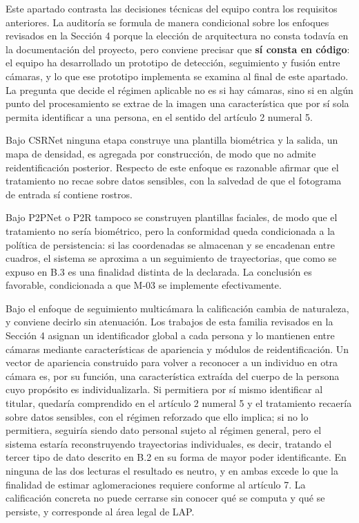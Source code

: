 Este apartado contrasta las decisiones técnicas del equipo contra los
requisitos anteriores. La auditoría se formula de manera condicional
sobre los enfoques revisados en la Sección 4 porque la elección de
arquitectura no consta todavía en la documentación del proyecto, pero
conviene precisar que \textbf{sí consta en código}: el equipo ha
desarrollado un prototipo de detección, seguimiento y fusión entre
cámaras, y lo que ese prototipo implementa se examina al final de este
apartado. La pregunta que decide el régimen aplicable no es si hay
cámaras, sino si en algún punto del procesamiento se extrae de la imagen
una característica que por sí sola permita identificar a una persona, en
el sentido del artículo 2 numeral 5.

Bajo CSRNet \cite{Li_2018_CVPR} ninguna etapa construye una plantilla
biométrica y la salida, un mapa de densidad, es agregada por
construcción, de modo que no admite reidentificación posterior. Respecto
de este enfoque es razonable afirmar que el tratamiento no recae sobre
datos sensibles, con la salvedad de que el fotograma de entrada sí
contiene rostros.

Bajo P2PNet o P2R \cite{Song_2021_ICCV,Lin_2025_CVPR} tampoco se
construyen plantillas faciales, de modo que el tratamiento no sería
biométrico, pero la conformidad queda condicionada a la política de
persistencia: si las coordenadas se almacenan y se encadenan entre
cuadros, el sistema se aproxima a un seguimiento de trayectorias, que
como se expuso en B.3 es una finalidad distinta de la declarada. La
conclusión es favorable, condicionada a que M-03 se implemente
efectivamente.

Bajo el enfoque de seguimiento multicámara la calificación cambia de
naturaleza, y conviene decirlo sin atenuación. Los trabajos de esta
familia revisados en la Sección 4 asignan un identificador global a cada
persona y lo mantienen entre cámaras mediante características de
apariencia y módulos de reidentificación. Un vector de apariencia
construido para volver a reconocer a un individuo en otra cámara es, por
su función, una característica extraída del cuerpo de la persona cuyo
propósito es individualizarla. Si permitiera por sí mismo identificar al
titular, quedaría comprendido en el artículo 2 numeral 5 y el
tratamiento recaería sobre datos sensibles, con el régimen reforzado que
ello implica; si no lo permitiera, seguiría siendo dato personal sujeto
al régimen general, pero el sistema estaría reconstruyendo trayectorias
individuales, es decir, tratando el tercer tipo de dato descrito en B.2
en su forma de mayor poder identificante. En ninguna de las dos lecturas
el resultado es neutro, y en ambas excede lo que la finalidad de estimar
aglomeraciones requiere conforme al artículo 7. La calificación concreta
no puede cerrarse sin conocer qué se computa y qué se persiste, y
corresponde al área legal de LAP.

